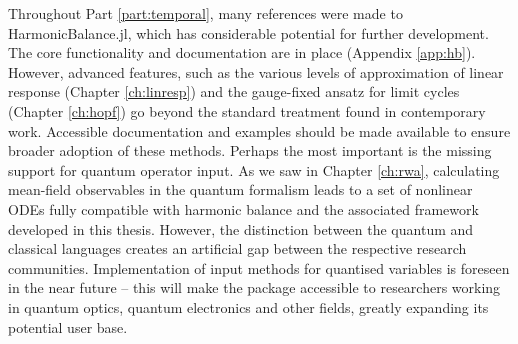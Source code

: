 Throughout Part \ref{part:temporal}, many references were made to HarmonicBalance.jl, which has considerable potential for further development. The core functionality and documentation are in place (Appendix \ref{app:hb}). However, advanced features, such as the various levels of approximation of linear response (Chapter \ref{ch:linresp}) and the gauge-fixed ansatz for limit cycles (Chapter \ref{ch:hopf}) go beyond the standard treatment found in contemporary work. Accessible documentation and examples should be made available to ensure broader adoption of these methods. Perhaps the most important is the missing support for quantum operator input. As we saw in Chapter \ref{ch:rwa}, calculating mean-field observables in the quantum formalism leads to a set of nonlinear ODEs fully compatible with harmonic balance and the associated framework developed in this thesis. However, the distinction between the quantum and classical languages creates an artificial gap between the respective research communities. Implementation of input methods for quantised variables is foreseen in the near future -- this will make the package accessible to researchers working in quantum optics, quantum electronics and other fields, greatly expanding its potential user base. 